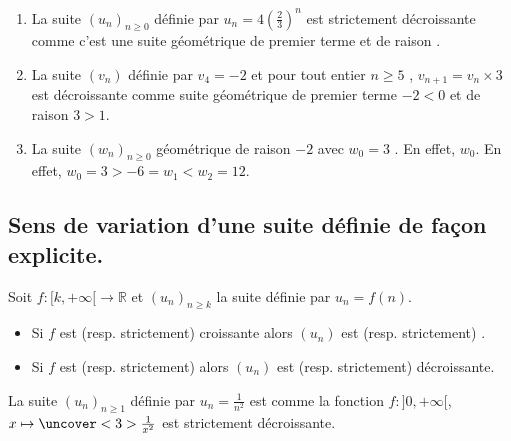 \documentclass{beamer}
\begin{document}
 \begin{frame}
 \begin{example}
    
    \begin{enumerate}
     \item La suite $(u_n)_{n \geq 0}$ définie par $u_n=4(\frac{2}{3})^n$ est strictement décroissante comme 
     c'est une suite géométrique de premier terme  et de raison 
     .
     \item La suite $(v_n)$ définie par $v_4=-2$ et pour tout entier $n \geq 5$
     , $v_{n+1}=v_n \times 3$ est  décroissante comme suite géométrique de premier
     terme $-2<0$ et de raison $3>1$.
     \item La suite $(w_n)_{n \geq 0}$ géométrique de raison $-2$ avec $w_0=3$  . En effet,
     $w_0$. En effet, $w_0=3>-6=w_1<w_2=12$.
    \end{enumerate}
 \end{example}
 \end{frame}
 
 \subsection{Sens de variation d'une suite définie de façon explicite.}
 
 \begin{frame}
  \begin{theorem}
  Soit $f:[k,+\infty[ \to \mathbb{R}$ et $(u_n)_{n \geq k}$ la suite définie par $u_n=f(n)$.
  \begin{itemize}
   \item Si $f$ est (resp. strictement) croissante alors $(u_n)$ est (resp. strictement) 
   .
   \item Si $f$ est (resp. strictement) 
   alors $(u_n)$ est (resp. strictement) décroissante.
 \end{itemize}
 \end{theorem}
 \end{frame}
 
 \begin{frame}
 \begin{example}
 La suite $(u_n)_{n \geq 1}$ définie par $u_n=\frac{1}{n^2}$ est  comme 
     la fonction $f:]0,+\infty[$,$x \mapsto \uncover<3>{\frac{1}{x^2}}$ est strictement décroissante.
\end{example}
\end{frame}
\end{document}
